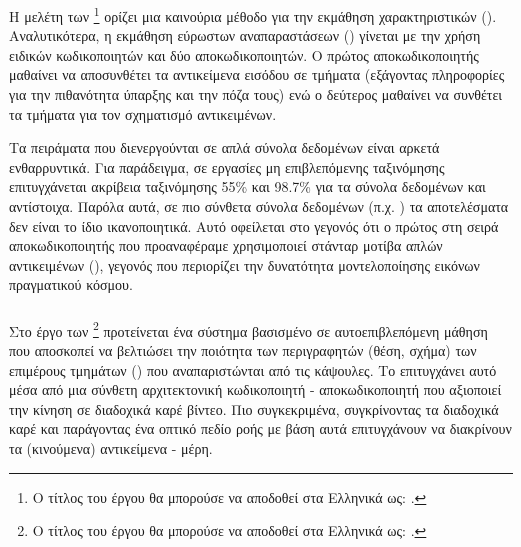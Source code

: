 \subsubsection{}

Η μελέτη των  \footnote{Ο τίτλος του έργου θα μπορούσε να αποδοθεί στα Ελληνικά ως: .} \cite{kosiorek2019stacked} ορίζει μια καινούρια μέθοδο για την εκμάθηση χαρακτηριστικών (). Αναλυτικότερα, η εκμάθηση εύρωστων αναπαραστάσεων () γίνεται με την χρήση ειδικών κωδικοποιητών και δύο αποκωδικοποιητών. Ο πρώτος αποκωδικοποιητής μαθαίνει να αποσυνθέτει τα αντικείμενα εισόδου σε τμήματα (εξάγοντας πληροφορίες για την πιθανότητα ύπαρξης και την πόζα τους) ενώ ο δεύτερος μαθαίνει να συνθέτει τα τμήματα για τον σχηματισμό αντικειμένων.\par

Τα πειράματα που διενεργούνται σε απλά σύνολα δεδομένων είναι αρκετά ενθαρρυντικά. Για παράδειγμα, σε εργασίες μη επιβλεπόμενης ταξινόμησης επιτυγχάνεται ακρίβεια ταξινόμησης 55\% και 98.7\% για τα σύνολα δεδομένων  και  αντίστοιχα. Παρόλα αυτά, σε πιο σύνθετα σύνολα δεδομένων (π.χ. ) τα αποτελέσματα δεν είναι το ίδιο ικανοποιητικά. Αυτό οφείλεται στο γεγονός ότι ο πρώτος στη σειρά αποκωδικοποιητής που προαναφέραμε χρησιμοποιεί στάνταρ μοτίβα απλών αντικειμένων (), γεγονός που περιορίζει την δυνατότητα μοντελοποίησης εικόνων πραγματικού κόσμου.

\subsubsection{}

Στο έργο των  \footnote{Ο τίτλος του έργου θα μπορούσε να αποδοθεί στα Ελληνικά ως: .} \cite{pmlr-v139-sabour21a} προτείνεται ένα σύστημα βασισμένο σε αυτο\textendash επιβλεπόμενη μάθηση που αποσκοπεί να βελτιώσει την ποιότητα των περιγραφητών (θέση, σχήμα) των επιμέρους τμημάτων () που αναπαριστώνται από τις κάψουλες. Το επιτυγχάνει αυτό μέσα από μια σύνθετη αρχιτεκτονική κωδικοποιητή - αποκωδικοποιητή που αξιοποιεί την κίνηση σε διαδοχικά καρέ βίντεο. Πιο συγκεκριμένα, συγκρίνοντας τα διαδοχικά καρέ και παράγοντας ένα οπτικό πεδίο ροής με βάση αυτά επιτυγχάνουν να διακρίνουν τα (κινούμενα) αντικείμενα - μέρη.\par 

